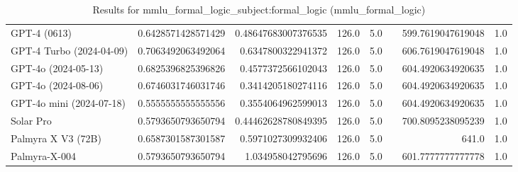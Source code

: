 \begin{table}[htp]
{\begin{tabular}{lrrrrrrr}
GPT-4 (0613) & 0.6428571428571429 & 0.48647683007376535 & 126.0 & 5.0 &  & 599.7619047619048 & 1.0 \\
GPT-4 Turbo (2024-04-09) & 0.7063492063492064 & 0.6347800322941372 & 126.0 & 5.0 &  & 606.7619047619048 & 1.0 \\
GPT-4o (2024-05-13) & 0.6825396825396826 & 0.4577372566102043 & 126.0 & 5.0 &  & 604.4920634920635 & 1.0 \\
GPT-4o (2024-08-06) & 0.6746031746031746 & 0.3414205180274116 & 126.0 & 5.0 &  & 604.4920634920635 & 1.0 \\
GPT-4o mini (2024-07-18) & 0.5555555555555556 & 0.3554064962599013 & 126.0 & 5.0 &  & 604.4920634920635 & 1.0 \\
Solar Pro & 0.5793650793650794 & 0.44462628780849395 & 126.0 & 5.0 &  & 700.8095238095239 & 1.0 \\
Palmyra X V3 (72B) & 0.6587301587301587 & 0.5971027309932406 & 126.0 & 5.0 &  & 641.0 & 1.0 \\
Palmyra-X-004 & 0.5793650793650794 & 1.034958042795696 & 126.0 & 5.0 &  & 601.7777777777778 & 1.0 \\
\bottomrule
\end{tabular}}
\caption{Results for mmlu_formal_logic_subject:formal_logic (mmlu_formal_logic)}
\label{fig:mmlu_formal_logic_subject:formal_logic (mmlu_formal_logic)}
\end{table}